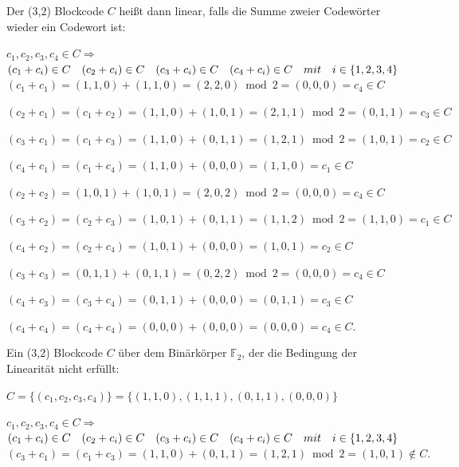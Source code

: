 \begin{Theorem}
    Der (\(3\),\(2\)) Blockcode \(C\) hei\ss{}t dann linear, falls die Summe zweier Codewörter wieder ein Codewort ist:
\end{Theorem}
    
    
\begin{Beweis}
    $c_1, c_2, c_3, c_4 \in C \Rightarrow$ $(c_1 + c_i) \in C \quad (c_2 + c_{i}) \in C \quad (c_3 + c_{i}) \in C \quad (c_4 + c_{i}) \in C \quad mit\\ 
    \quad i \in \{1, 2, 3, 4\}$
    \\
    
    $(c_1 + c_1) = (1,1,0) + (1,1,0) = (2,2,0) \bmod 2 = (0,0,0) = c_4 \in C$
    
    $(c_2 + c_1) = (c_1 + c_2) = (1,1,0) + (1,0,1) = (2,1,1) \bmod 2 = (0,1,1) = c_3 \in C$
    
    $(c_3 + c_1) = (c_1 + c_3) = (1,1,0) + (0,1,1) = (1,2,1) \bmod 2 = (1,0,1) = c_2 \in C$
    
    $(c_4 + c_1) = (c_1 + c_4) = (1,1,0) + (0,0,0) = (1,1,0) = c_1 \in C$
    
    $(c_2 + c_2) = (1,0,1) + (1,0,1) = (2,0,2) \bmod 2 = (0,0,0) = c_4 \in C$
    
    $(c_3 + c_2) = (c_2 + c_3) = (1,0,1) + (0,1,1) = (1,1,2) \bmod 2 = (1,1,0) = c_1 \in C$
    
    $(c_4 + c_2) = (c_2 + c_4) = (1,0,1) + (0,0,0) = (1,0,1) = c_2 \in C$
    
    $(c_3 + c_3) = (0,1,1) + (0,1,1) = (0,2,2) \bmod 2 = (0,0,0) = c_4 \in C$
    
    $(c_4 + c_3) = (c_3 + c_4) = (0,1,1) + (0,0,0) = (0,1,1) = c_3 \in C$
    
    $(c_4 + c_4) = (c_4 + c_4) = (0,0,0) + (0,0,0) = (0,0,0) = c_4 \in C$. 
\end{Beweis}
    
\begin{Beispiel}
    Ein (\(3\),\(2\)) Blockcode \(C\) über dem Binärkörper $\mathbb{F}_{2}$, der die Bedingung der Linearität nicht erfüllt:
    
    $C = \{(c_1, c_2, c_3, c_4)\} = \{(1,1,0),(1,1,1),(0,1,1),(0,0,0)\}$\\
\end{Beispiel}
    
\begin{Beweis}
    $c_1, c_2, c_3, c_4 \in C \Rightarrow$ $(c_1 + c_i) \in C \quad (c_2 + c_{i}) \in C \quad (c_3 + c_{i}) \in C \quad (c_4 + c_{i}) \in C \quad mit\\
    \quad i \in \{1, 2, 3, 4\}$\\
    
    
    $(c_3 + c_1) = (c_1 + c_3) = (1,1,0) + (0,1,1) = (1,2,1) \bmod 2 = (1,0,1) \notin C.$\\ 
\end{Beweis}\cite{lntww2023} 
    

